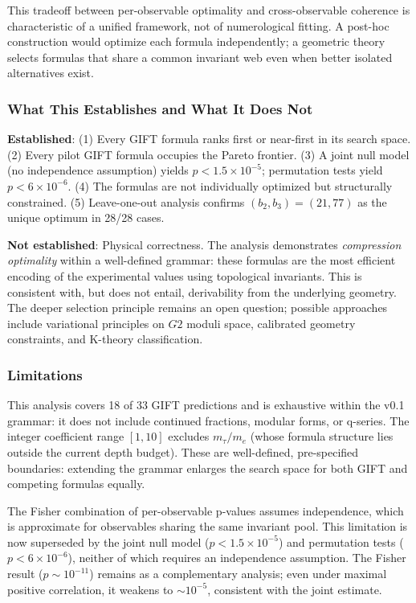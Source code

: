 \documentclass[11pt,a4paper]{article}
\newcommand{\Gtwo}{\mathrm{G}_2}
\def\Gtwo{G2}%
\begin{document}
This tradeoff between per-observable optimality and cross-observable coherence is characteristic of a unified framework, not of numerological fitting. A post-hoc construction would optimize each formula independently; a geometric theory selects formulas that share a common invariant web even when better isolated alternatives exist.

\subsubsection{What This Establishes and What It Does Not}

\textbf{Established}: (1) Every GIFT formula ranks first or near-first in its search space. (2) Every pilot GIFT formula occupies the Pareto frontier. (3) A joint null model (no independence assumption) yields $p < 1.5 \times 10^{-5}$; permutation tests yield $p < 6 \times 10^{-6}$. (4) The formulas are not individually optimized but structurally constrained. (5) Leave-one-out analysis confirms $(b_2, b_3) = (21, 77)$ as the unique optimum in 28/28 cases.

\textbf{Not established}: Physical correctness. The analysis demonstrates \textit{compression optimality} within a well-defined grammar: these formulas are the most efficient encoding of the experimental values using topological invariants. This is consistent with, but does not entail, derivability from the underlying geometry. The deeper selection principle remains an open question; possible approaches include variational principles on $\Gtwo$ moduli space, calibrated geometry constraints, and K-theory classification.

\subsubsection{Limitations}

This analysis covers 18 of 33 GIFT predictions and is exhaustive within the v0.1 grammar: it does not include continued fractions, modular forms, or q-series. The integer coefficient range $[1, 10]$ excludes $m_\tau/m_e$ (whose formula structure lies outside the current depth budget). These are well-defined, pre-specified boundaries: extending the grammar enlarges the search space for both GIFT and competing formulas equally.

The Fisher combination of per-observable p-values assumes independence, which is approximate for observables sharing the same invariant pool. This limitation is now superseded by the joint null model ($p < 1.5 \times 10^{-5}$) and permutation tests ($p < 6 \times 10^{-6}$), neither of which requires an independence assumption. The Fisher result ($p \sim 10^{-11}$) remains as a complementary analysis; even under maximal positive correlation, it weakens to $\sim 10^{-5}$, consistent with the joint estimate.
\end{document}
